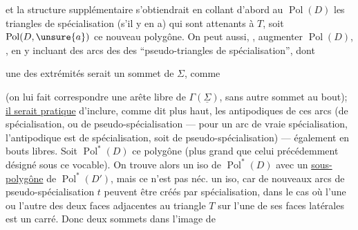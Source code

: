 

et la structure supplémentaire s'obtiendrait en collant d'abord au $\operatorname{Pol}(D)$ les triangles de spécialisation (s'il y en a) qui sont attenants à $T$, soit $\operatorname{Pol}(D,\unsure{a})$  ce nouveau polygône. On peut aussi, , augmenter  $\operatorname{Pol}(D)$, , en y incluant des arcs des  des ``pseudo-triangles de spécialisation'', dont



une des extrémités serait un sommet de $\Sigma$, comme


(on lui fait correspondre une arête libre de $\Gamma(\underline\Sigma)$, sans autre sommet au bout); \uline{il serait pratique} d'inclure, comme dit plus haut, les antipodiques de  ces arcs (de spécialisation, ou de pseudo-spécialisation --- pour un arc de vraie spécialisation,  l'antipodique est  de spécialisation, soit de pseudo-spécialisation) --- également en bouts libres. Soit $\operatorname{Pol}^*(D)$ ce polygône (plus grand que celui précédemment désigné sous ce vocable). On trouve alors un  iso de $\operatorname{Pol}^*(D)$ avec un \uline{sous-polygône} de $\operatorname{Pol}^*(D')$, mais ce n'est pas néc. un iso, car de nouveaux arcs de pseudo-spécialisation  $t$ peuvent être créés par spécialisation, dans le cas où l'une ou l'autre des deux faces adjacentes au triangle $T$ sur l'une de ses  faces latérales est un carré. Donc  deux  sommets  dans l'image de

